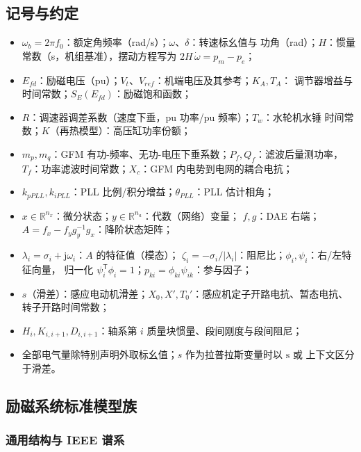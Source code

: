 \subsection{记号与约定}\label{sec:dy-th-ctl-notation}
\begin{itemize}
  \item $\omega_b=2\pi f_0$：额定角频率（rad/s）；$\omega$、$\delta$：转速标幺值与
        功角（rad）；$H$：惯量常数（s，机组基准），摆动方程写为
        $2H\,\dot\omega=p_m-p_e$；
  \item $E_{fd}$：励磁电压（pu）；$V_t$、$V_{ref}$：机端电压及其参考；$K_A,T_A$：
        调节器增益与时间常数；$S_E(E_{fd})$：励磁饱和函数；
  \item $R$：调速器调差系数（速度下垂，pu 功率/pu 频率）；$T_w$：水轮机水锤
        时间常数；$K$（再热模型）：高压缸功率份额；
  \item $m_p,m_q$：GFM 有功-频率、无功-电压下垂系数；$P_f,Q_f$：滤波后量测功率，
        $T_f$：功率滤波时间常数；$X_c$：GFM 内电势到电网的耦合电抗；
  \item $k_{pPLL},k_{iPLL}$：PLL 比例/积分增益；$\theta_{PLL}$：PLL 估计相角；
  \item $x\in\mathbb R^{n_x}$：微分状态；$y\in\mathbb R^{n_a}$：代数（网络）变量；
        $f,g$：DAE 右端；$A=f_x-f_yg_y^{-1}g_x$：降阶状态矩阵；
  \item $\lambda_i=\sigma_i+\mathrm j\omega_i$：$A$ 的特征值（模态）；
        $\zeta_i=-\sigma_i/|\lambda_i|$：阻尼比；$\phi_i,\psi_i$：右/左特征向量，
        归一化 $\psi_i^{\mathsf T}\phi_i=1$；$p_{ki}=\phi_{ki}\psi_{ik}$：参与因子；
  \item $s$（滑差）：感应电动机滑差；$X_0,X',T_0'$：感应机定子开路电抗、暂态电抗、
        转子开路时间常数；
  \item $H_i,K_{i,i+1},D_{i,i+1}$：轴系第 $i$ 质量块惯量、段间刚度与段间阻尼；
  \item 全部电气量除特别声明外取标幺值；$s$ 作为拉普拉斯变量时以 $\mathrm{s}$ 或
        上下文区分于滑差。
\end{itemize}

\subsection{励磁系统标准模型族}\label{sec:dy-th-ctl-exc}

\subsubsection{通用结构与 IEEE 谱系}

